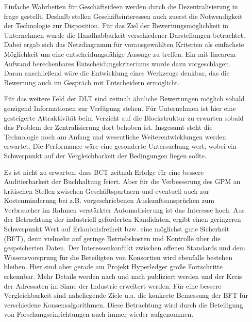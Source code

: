 
Einfache Wahrheiten für Geschäftsideen werden durch die Dezentralisierung in frage gestellt.
Deshalb stellen Geschäftsinteressen auch zuerst die Notwendigkeit der Technologie zur Disposition.
Für das Ziel der Bewertungsmöglichkeit in Unternehmen wurde die Handhabbarkeit verschiedener Darstellungen betrachtet.
Dabei ergab sich das Netzdiagramm für vorausgewählten Kriterien als einfachste Möglichkeit um eine entscheidungsfähige Aussage zu treffen.
Ein mit linearem Aufwand berechenbares Entscheidungskriteriums wurde dazu vorgeschlagen.
Daran anschließend wäre die Entwicklung eines Werkzeugs denkbar, das die Bewertung auch im Gespräch mit Entscheidern ermöglicht.

Für das weitere Feld der \gls{DLT} sind zeitnah ähnliche Bewertungen möglich sobald genügend Informationen zur Verfügung stehen.
Für Unternehmen ist hier eine gesteigerte Attraktivität beim Verzicht auf die Blockstruktur zu erwarten sobald das Problem der Zentralisierung dort behoben ist.
Insgesamt steht die Technologie noch am Anfang und wesentliche Weiterentwicklungen werden erwartet.
Die Performance wäre eine gesonderte Untersuchung wert, wobei ein Schwerpunkt auf der Vergleichbarkeit der Bedingungen liegen sollte.

Es ist nicht zu erwarten, dass \gls{BCT} zeitnah Erfolge für eine bessere Auditierbarkeit der Buchhaltung feiert.
Aber für die Verbesserung des \gls{GPM} an kritischen Stellen zwischen Geschäftspartnern und eventuell auch zur Kostenminderung bei z.B. vorgeschriebenen Auskunftsansprüchen zum Verbraucher im Rahmen verstärkter Automatisierung ist das Interesse hoch.
Aus der Betrachtung der industriell geförderten Kandidaten, ergibt einen geringeren Schwerpunkt Wert auf Erlaubnisfreiheit bzw. eine möglichst gute Sicherheit (\gls{BFT}),
denn vielmehr auf geringe Betriebskosten und Kontrolle über die gespeicherten Daten.
Der Interessenkonflikt zwischen offenen Standards und dem Wissensvorsprung für die Beteiligten von Konsortien wird ebenfalls bestehen bleiben.
Hier sind aber gerade am Projekt Hyperledger große Fortschritte erkennbar.
Mehr Details werden nach und nach publiziert werden und der Kreis der Adressaten im Sinne der Industrie erweitert werden.
Für eine bessere Vergleichbarkeit sind naheliegende Ziele u.a. die konkrete Bemessung der \gls{BFT} für verschiedene Konsensalgorithmen.
Diese Betrachtung wird durch die Beteiligung von Forschungseinrichtungen auch immer wieder aufgenommen.



